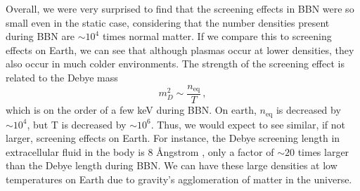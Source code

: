 Overall, we were very surprised to find that the screening effects in BBN were so small even in the static case, considering that the number densities present during BBN are $\sim 10^4$ times normal matter. If we compare this to screening effects on Earth, we can see that although plasmas occur at lower densities, they also occur in much colder environments. The strength of the screening effect is related to the Debye mass
\begin{equation}
m_D^2 \sim \frac{n_\text{eq} }{T}\,,
\end{equation}
which is on the order of a few keV during BBN. On earth, $n_\text{eq}$ is decreased by $\sim 10^4$, but T is decreased by $\sim 10^6$. Thus, we would expect to see similar, if not larger, screening effects on Earth. For instance, the Debye screening length in extracellular fluid in the body is 8 \AA ngstrom \cite{Wennerstrom:2020}, only a factor of $\sim 20$ times larger than the Debye length during BBN. We can have these large densities at low temperatures on Earth due to gravity's agglomeration of matter in the universe.

